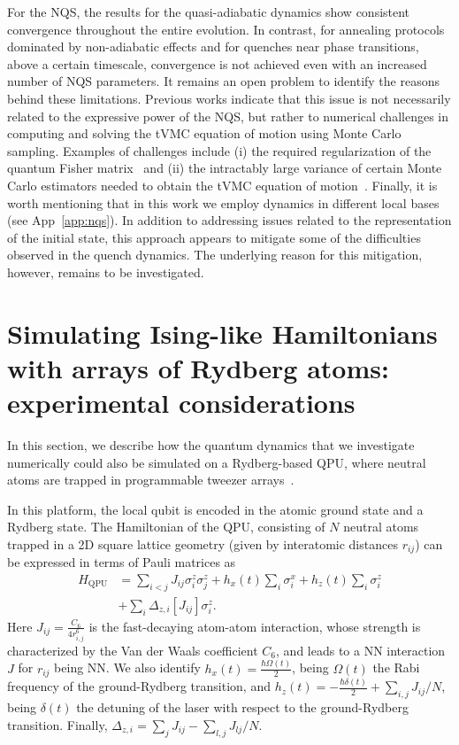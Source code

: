 \documentclass[aps,pra,reprint,amssymb,superscriptaddress]{revtex4-2}
\begin{document}
For the NQS, the results for the quasi-adiabatic dynamics show consistent convergence throughout the entire evolution.
In contrast, for annealing protocols dominated by non-adiabatic effects and for quenches near phase transitions, above a certain timescale, convergence is not achieved even with an increased number of NQS parameters. 
It remains an open problem to identify the reasons behind these limitations. Previous works indicate that this issue is not necessarily related to the expressive power of the NQS, but rather to numerical challenges in computing and solving the tVMC equation of motion using Monte Carlo sampling. Examples of challenges  include (i) the required regularization of the quantum Fisher matrix~\cite{schmitt_quantum_2020} and (ii) the intractably large variance of certain Monte Carlo estimators needed to obtain the tVMC equation of motion~\cite{sinibaldi_unbiasing_2023}.
Finally, it is worth mentioning that in this work we employ dynamics in different local bases (see App~\ref{app:nqs}). In addition to addressing issues related to the representation of the initial state, this approach appears to mitigate some of the difficulties observed in the quench dynamics. The underlying reason for this mitigation, however, remains to be investigated.

\section{Simulating Ising-like Hamiltonians with arrays of Rydberg atoms: experimental considerations}
\label{sec7} 

In this section, we describe how the quantum dynamics that we investigate numerically could also be simulated on a Rydberg-based QPU, where neutral atoms are trapped in programmable tweezer arrays~\cite{browaeys_many-body_2020, saffman_quantum_2010, henriet_quantum_2020}. 

In this platform, the local qubit is encoded in the atomic ground state and a Rydberg state. The Hamiltonian of the QPU, consisting of $N$ neutral atoms trapped in a 2D square lattice geometry (given by interatomic distances $r_{ij}$) can be expressed in terms of Pauli matrices as 
%
\begin{equation}\label{eq:ham_qpu_2}
\begin{split}
    H_{\text{QPU}} & = \sum_{i<j} J_{ij} \sigma^z_i\sigma^z_j+
    h_x(t) \sum_i \sigma^x_i   + h_z(t)\sum_{i}\sigma^z_i \\
    &+ \sum_i\Delta_{z,i}\left[J_{ij}\right]\sigma^z_i.
\end{split}
\end{equation}
Here $J_{ij} = \frac{C_6}{4 r_{i,j}^6}$ is the fast-decaying atom-atom interaction, whose strength is characterized by the Van der Waals coefficient $C_6$, and leads to a NN interaction $J$ for $r_{ij}$ being NN. We also identify $h_x(t) = \frac{\hbar\Omega(t)}{2}$, being $\Omega(t)$ the Rabi frequency of the ground-Rydberg transition, and $h_z(t)=-\frac{\hbar\delta(t)}{2}+\sum_{i,j}J_{ij}/N$, being $\delta(t)$ the detuning of the laser with respect to the ground-Rydberg transition. Finally,  $\Delta_{z,i}=\sum_{j}J_{ij}-\sum_{l,j}J_{lj}/N$.
\end{document}
